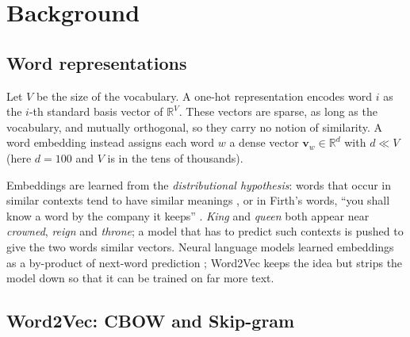 \section{Background}
\label{sec:background}

\subsection{Word representations}

Let $V$ be the size of the vocabulary. A one-hot representation encodes word $i$ as the $i$-th standard basis vector of $\mathbb{R}^{V}$. These vectors are sparse, as long as the vocabulary, and mutually orthogonal, so they carry no notion of similarity. A word embedding instead assigns each word $w$ a dense vector $\mathbf{v}_w \in \mathbb{R}^{d}$ with $d \ll V$ (here $d = 100$ and $V$ is in the tens of thousands).

Embeddings are learned from the \emph{distributional hypothesis}: words that occur in similar contexts tend to have similar meanings \citep{harris1954distributional}, or in Firth's words, ``you shall know a word by the company it keeps'' \citep{firth1957synopsis}. \textit{King} and \textit{queen} both appear near \textit{crowned}, \textit{reign} and \textit{throne}; a model that has to predict such contexts is pushed to give the two words similar vectors. Neural language models learned embeddings as a by-product of next-word prediction \citep{bengio2003neural}; Word2Vec keeps the idea but strips the model down so that it can be trained on far more text.

\subsection{Word2Vec: CBOW and Skip-gram}

